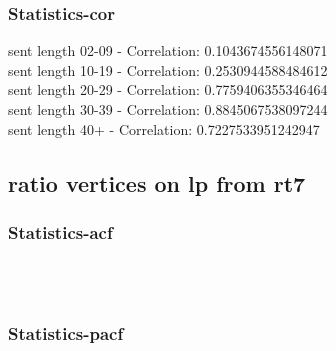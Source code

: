 \documentclass{article}%
\begin{document}
%
\newpage%
\subsubsection{Statistics{-}cor}%
\label{ssubsec:Statistics{-}cor}%
\noindent%
sent length 02-09 - Correlation: 0.1043674556148071\\%
sent length 10-19 - Correlation: 0.2530944588484612\\%
sent length 20-29 - Correlation: 0.7759406355346464\\%
sent length 30-39 - Correlation: 0.8845067538097244\\%
sent length 40+ - Correlation: 0.7227533951242947\\

%
\newpage

%
\subsection{ratio vertices on lp from rt7}%
\label{subsec:ratioverticesonlpfromrt7}%
\subsubsection{Statistics{-}acf}%
\label{ssubsec:Statistics{-}acf}%


\begin{figure}[ht]%
\centering%
\setlength{\abovecaptionskip}{-35pt}%
%
%
\\%
%
%
\\%
%
\end{figure}

%
\newpage%
\subsubsection{Statistics{-}pacf}%
\label{ssubsec:Statistics{-}pacf}%
\end{document}

